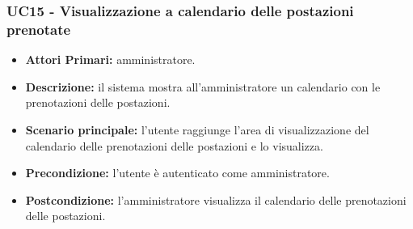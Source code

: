 \subsubsection{ UC15 - Visualizzazione a calendario delle postazioni prenotate}
\begin{itemize}
	\item\textbf{Attori Primari:}
	amministratore.
	\item\textbf{Descrizione:}
	il sistema mostra all'amministratore un calendario con le prenotazioni delle postazioni.
	\item\textbf{Scenario principale:}
	l'utente raggiunge l'area di visualizzazione del calendario delle prenotazioni delle postazioni e lo visualizza.
	\item\textbf{Precondizione:} 
	l'utente è autenticato come amministratore.
	\item\textbf{Postcondizione:}
	l'amministratore visualizza il calendario delle prenotazioni delle postazioni.
\end{itemize}

